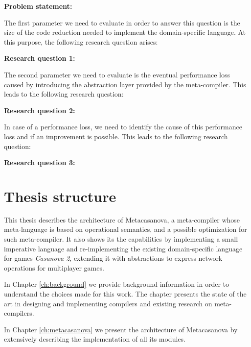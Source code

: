 \vspace{0.5cm}
\noindent
\textbf{Problem statement: } \textit{\psContent}

\vspace{0.5cm}
\noindent
The first parameter we need to evaluate in order to answer this question is the size of the code reduction needed to implement the domain-specific language. At this purpose, the following research question arises:

\vspace{0.5cm}
\noindent
\textbf{Research question 1: } \textit{\rqContentOne}

\vspace{0.5cm}
\noindent
The second parameter we need to evaluate is the eventual performance loss caused by introducing the abstraction layer provided by the meta-compiler. This leads to the following research question:

\vspace{0.5cm}
\noindent
\textbf{Research question 2: } \textit{\rqContentTwo}

\vspace{0.5cm}
\noindent
In case of a performance loss, we need to identify the cause of this performance loss and if an improvement is possible. This leads to the following research question:

\vspace{0.5cm}
\noindent
\textbf{Research question 3: } \textit{\rqContentThree}

\vspace{0.5cm}
\noindent

\section{Thesis structure}
This thesis describes the architecture of Metacasanova, a meta-compiler whose meta-language is based on operational semantics, and a possible optimization for such meta-compiler. It also shows its the capabilities by implementing a small imperative language and re-implementing the existing domain-specific language for games \textit{Casanova 2}, extending it with abstractions to express network operations for multiplayer games.

In Chapter \ref{ch:background} we provide background information in order to understand the choices made for this work. The chapter presents the state of the art in designing and implementing compilers and existing research on meta-compilers.

In Chapter \ref{ch:metacasanova} we present the architecture of Metacasanova by extensively describing the implementation of all its modules.

